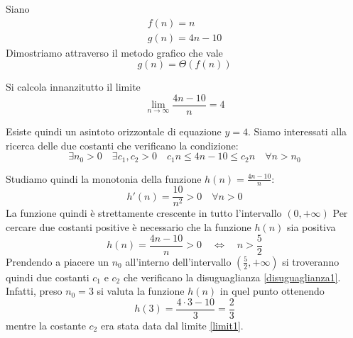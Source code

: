 \begin{figure}[ht!]
	\caption{}
\end{figure}

\begin{example}
	Siano
	\[
	\begin{array}{l}
		f(n)=n \\
		g(n)=4n-10
	\end{array}
	\]
	Dimostriamo attraverso il metodo grafico che vale $$g(n)=\Theta(f(n))$$

	Si calcola innanzitutto il limite
	\begin{equation}\label{limit1}
		\lim_{n \to \infty} \frac{4n-10}{n}= 4
	\end{equation}


	Esiste quindi un asintoto orizzontale di equazione $y=4$. Siamo interessati alla ricerca delle due costanti che verificano la condizione:
	\begin{equation}\label{disuguaglianza1}
		\exists n_{0} >0 \quad \exists c_{1},c_{2}>0 \quad c_{1}n \leq 4n-10 \leq c_{2}n \quad \forall n > n_{0}
	\end{equation}

	Studiamo quindi la monotonia della funzione $h(n)=\frac{4n-10}{n}$:
	$$
	h'(n)= \frac{10}{n^{2}} > 0 \quad \forall n>0
	$$
	La funzione quindi è strettamente crescente in tutto l'intervallo $(0,+\infty)$
	Per cercare due costanti positive è necessario che la funzione $h(n)$ sia positiva
	$$
	h(n)=\frac{4n-10}{n}>0 \quad \iff \quad n> \frac{5}{2}
	$$
	Prendendo a piacere un $n_{0}$ all'interno dell'intervallo $(\frac{5}{2}, +\infty)$ si troveranno quindi due costanti $c_{1}$ e $c_{2}$ che verificano la disuguaglianza \ref{disuguaglianza1}. Infatti, preso $n_{0}=3$ si valuta la funzione $h(n)$ in quel punto ottenendo $$h(3)=\frac{4\cdot3-10}{3}=\frac{2}{3}$$ mentre la costante $c_{2}$ era stata data dal limite \ref{limit1}.
\end{example}